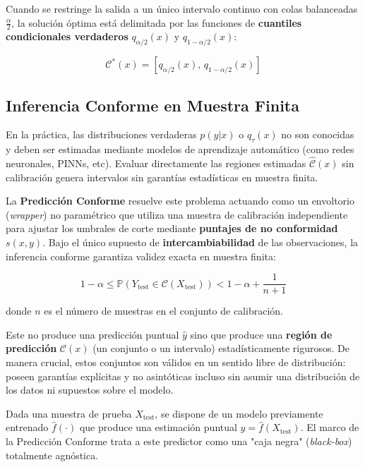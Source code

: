 Cuando se restringe la salida a un único intervalo continuo con colas balanceadas $\frac{\alpha}{2}$, la solución óptima está delimitada por las funciones de \textbf{cuantiles condicionales verdaderos} $q_{\alpha / 2}(x)$ y $q_{1-\alpha / 2}(x)$:

\begin{equation}
    \mathcal{C}^*(x) = \left[ q_{\alpha/2}(x), \, q_{1-\alpha/2}(x) \right]
\end{equation}

\subsection{Inferencia Conforme en Muestra Finita}

En la práctica, las distribuciones verdaderas $p(y|x)$ o $q_\tau(x)$ no son conocidas y deben ser estimadas mediante modelos de aprendizaje automático (como redes neuronales, PINNs, etc). Evaluar directamente las regiones estimadas $\hat{\mathcal{C}}(x)$ sin calibración genera intervalos sin garantías estadísticas en muestra finita.

La \textbf{Predicción Conforme} resuelve este problema actuando como un envoltorio (\textit{wrapper}) no paramétrico que utiliza una muestra de calibración independiente para ajustar los umbrales de corte mediante \textbf{puntajes de no conformidad} $s(x, y)$. Bajo el único supuesto de \textbf{intercambiabilidad} de las observaciones, la inferencia conforme garantiza validez exacta en muestra finita:

\begin{equation}
    1-\alpha \le \mathbb{P}\left(Y_{\text{test}} \in \mathcal{C}(X_{\text{test}})\right) < 1-\alpha + \frac{1}{n+1}
    \label{eq:marg}
\end{equation}

donde $n$ es el número de muestras en el conjunto de calibración.



Este no produce una predicción puntual $\hat{y}$ sino que produce una \textbf{región de predicción} $\mathcal{C}(x)$ (un conjunto o un intervalo) estadísticamente rigurosos.
De manera crucial, estos conjuntos son válidos en un sentido libre de distribución: poseen garantías explícitas y no asintóticas incluso sin asumir una distribución de los datos ni supuestos sobre el modelo.


Dada una muestra de prueba $X_{\text{test}}$, se dispone de un modelo previamente entrenado $\hat{f}(\cdot)$ que produce una estimación puntual $\hat{y} = \hat{f}(X_{\text{test}})$. El marco de la Predicción Conforme trata a este predictor como una "caja negra" (\textit{black-box}) totalmente agnóstica.

